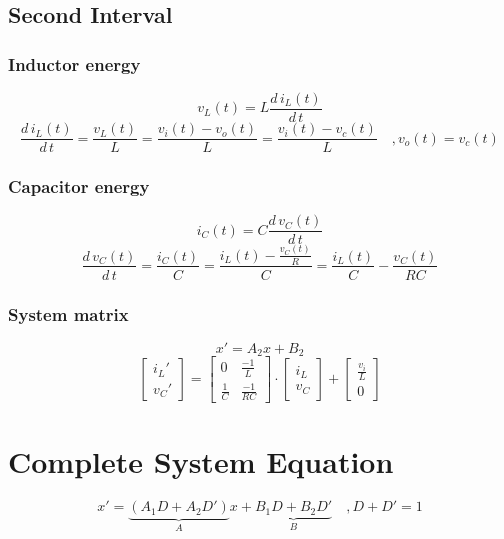 \subsection{Second Interval}

\subsubsection{Inductor energy}
\[ 
	v_L(t)
	= L \frac{d\,i_L(t)}{d\,t}
\]
\[
	\frac{d\,i_L(t)}{d\,t}
	= \frac{v_L(t)}{L}
	= \frac{v_i(t) - v_o(t)}{L}
	= \frac{v_i(t) - v_c(t)}{L}
	\quad, v_o(t) = v_c(t)
\]

\subsubsection{Capacitor energy}
\[
	i_C(t) 
	= C \frac{d\,v_C(t)}{d\,t}
\]
\[
	\frac{d\,v_C(t)}{d\,t}
	= \frac{i_C(t)}{C}
	= \frac{i_L(t) - \frac{v_C(t)}{R}}{C}
	= \frac{i_L(t)}{C} - \frac{v_C(t)}{R C}
\]

\subsubsection{System matrix}
\[
	x'  = A_2 x + B_2
\]
\[
	\begin{bmatrix}
		{i_L}' \\
		{v_C}'
	\end{bmatrix}
	=
	\begin{bmatrix}
		0 		& \frac{-1}{L} \\
		\frac{1}{C}	& \frac{-1}{R C}
	\end{bmatrix}
	\cdot
	\begin{bmatrix}
		i_L \\
		v_C
	\end{bmatrix}
	+
	\begin{bmatrix}
		\frac{v_i}{L} \\
		0
	\end{bmatrix}
\]

\section{Complete System Equation}

\[
	x' = \underbrace{(A_1 D + A_2 D')}_{A} x + \underbrace{B_1 D + B_2 D'}_{B} \quad, D + D' = 1
\]


